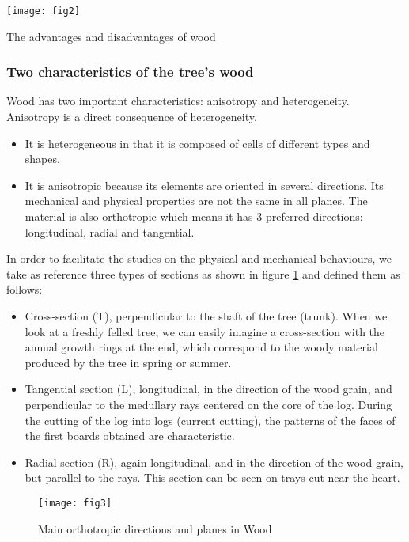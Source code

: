 \begin{table}[htp]
	\centering
	\texttt{[image: fig2]}
	\caption{The advantages and disadvantages of wood}
	\label{fig:fig2}
\end{table}

\subsubsection{Two characteristics of the tree's wood}

Wood has two important characteristics: anisotropy and heterogeneity. Anisotropy is a direct consequence of heterogeneity.

\begin{itemize}
	\item It is heterogeneous in that it is composed of cells of different types and shapes. 
	\item It is anisotropic because its elements are oriented in several directions. Its mechanical and physical properties are not the same in all planes. The material is also orthotropic which means it has 3 preferred directions: longitudinal, radial and tangential.
\end{itemize}

In order to facilitate the studies on the physical and mechanical behaviours, we take as reference three types of sections as shown in figure \ref{fig:fig3} and defined them as follows:

\begin{itemize}
	\item Cross-section (T), perpendicular to the shaft of the tree (trunk). When we look at a freshly felled tree, we can easily imagine a cross-section with the annual growth rings at the end, which correspond to the woody material produced by the tree in spring or summer.
	\item Tangential section (L), longitudinal, in the direction of the wood grain, and perpendicular to the medullary rays centered on the core of the log. During the cutting of the log into logs (current cutting), the patterns of the faces of the first boards obtained are characteristic.
	\item Radial section (R), again longitudinal, and in the direction of the wood grain, but parallel
	to the rays. This section can be seen on trays cut near the heart.
\end{itemize}


\begin{figure}[htp]
	\centering
	\texttt{[image: fig3]}
	\caption{Main orthotropic directions and planes in Wood}
	\label{fig:fig3}
\end{figure}

